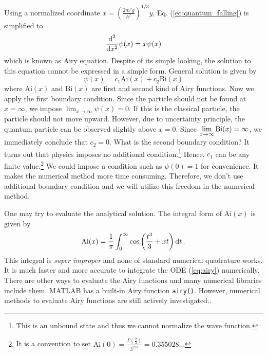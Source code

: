 Using a normalized coordinate $x=\left( \displaystyle\frac{2 m^2 g}{\hbar^2} \right )^{1/3} y$, Eq. (\ref{eq:quantum_falling}) is simplified to 
\begin{equation}\label{eq:airy}
\frac{\text{d}^2}{\text{d} x^2} \psi(x) = x \psi(x)
\end{equation}
which is known as Airy equation.  Despite of its simple looking, the solution to this equation cannot be expressed in a simple form.  General solution is given by
\begin{equation}
\psi(x) = c_1 \text{Ai}(x) + c_2 \text{Bi}(x)
\end{equation}
where $\text{Ai}(x)$ and $\text{Bi}(x)$ are first and second kind of Airy functions.\cite{airy_function}
Now we apply the first boundary condition.  Since the particle should not be found at $x=\infty$, we impose $\lim_{x \rightarrow \infty} \psi(x) = 0$.  If this is the classical particle, the particle should not move upward.  However, due to uncertainty principle, the quantum particle can be observed slightly above $x=0$.
Since $\displaystyle\lim_{x \rightarrow \infty} \operatorname{Bi}(x) = \infty$, we immediately conclude that $c_2=0$.  What is the second boundary condition?  It turns out that physics imposes no additional condition.\footnote{This is an unbound state and thus we cannot normalize the wave function.}  Hence, $c_1$ can be any finite value.\footnote{It is a convention to set $\text{Ai}(0)=\frac{\Gamma(\frac{2}{3})}{3^{2/3}} = 0.355028\dots$\cite{airy_function}} We could impose a condition such as $\psi(0)=1$ for convenience. It makes the numerical method more time consuming. Therefore, we don't use additional boundary condition and we will utilize this freedom in the numerical method.   

One may try to evaluate the analytical solution.  The integral form of $\text{Ai}(x)$ is given by
\begin{equation}
\operatorname{Ai}(x) = \frac{1}{\pi} \int_0^\infty \cos \left ( \frac{t^3}{3}+x t \right ) \text{d} t\,.
\end{equation}
This integral is \emph{super improper} and none of standard numerical quadrature works.   It is much faster and more accurate to integrate the ODE (\ref{eq:airy}) numerically.  There are other ways to evaluate the Airy functions and many numerical libraries include them. MATLAB has a built-in Airy function \texttt{airy()}.  However, numerical methods to evaluate Airy functions are still actively investigated.\cite{airy_numerical}.

